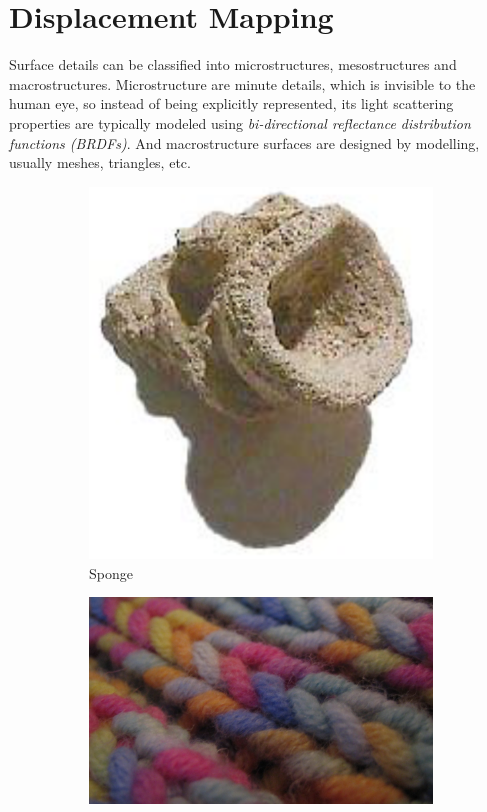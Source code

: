 \chapter{Displacement Mapping}
Surface details can be classified into microstructures, mesostructures and macrostructures. Microstructure are minute details, which is invisible to the human eye, so instead of being explicitly represented, its light scattering properties are typically modeled using \textit{bi-directional reflectance distribution functions (BRDFs)}. And macrostructure surfaces are designed by modelling, usually meshes, triangles, etc.

\begin{figure}\label{f:surface-details}
	\begin{subfigure}[t]{0.17\textwidth}
		\includegraphics[width=1.0\textwidth]{graphics/df/meso-structure-1}
		\caption{Sponge}
	\end{subfigure}
	\begin{subfigure}[t]{.285\textwidth}
		\includegraphics[width=1.0\textwidth]{graphics/df/meso-structure-2}

\end{subfigure}
\end{figure}
